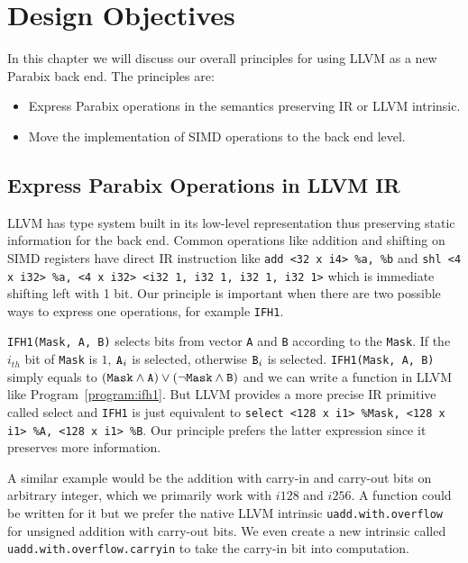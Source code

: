 %
%

\chapter{Design Objectives}
\label{three}

In this chapter we will discuss our overall principles for using LLVM as a new Parabix back end. The principles are:

\begin{itemize}
    \item Express Parabix operations in the semantics preserving IR or LLVM intrinsic.
    \item Move the implementation of SIMD operations to the back end level.
\end{itemize}

\section{Express Parabix Operations in LLVM IR}

LLVM has type system built in its low-level representation thus preserving static information for the back end. Common operations like addition and shifting on SIMD registers have direct IR instruction like \verb|add <32 x i4> %a, %b| and \verb|shl <4 x i32> %a, <4 x i32> <i32 1, i32 1, i32 1, i32 1>| which is immediate shifting left with 1 bit. Our principle is important when there are two possible ways to express one operations, for example {\tt IFH1}.

{\tt IFH1(Mask, A, B)} selects bits from vector {\tt A} and {\tt B} according to the {\tt Mask}. If the $i_{th}$ bit of {\tt Mask} is $1$, $\text{\tt A}_i$ is selected, otherwise $\text{\tt B}_i$ is selected. {\tt IFH1(Mask, A, B)} simply equals to $(\text{\tt Mask} \land \text{\tt A}) \lor (\lnot \text{\tt Mask} \land \text{\tt B})$ and we can write a function in LLVM like Program~\ref{program:ifh1}. But LLVM provides a more precise IR primitive called select and {\tt IFH1} is just equivalent to {\tt select <128 x i1> \%Mask, <128 x i1> \%A, <128 x i1> \%B}. Our principle prefers the latter expression since it preserves more information.

A similar example would be the addition with carry-in and carry-out bits on arbitrary integer, which we primarily work with $i128$ and $i256$. A function could be written for it but we prefer the native LLVM intrinsic {\tt uadd.with.overflow} for unsigned addition with carry-out bits. We even create a new intrinsic called {\tt uadd.with.overflow.carryin} to take the carry-in bit into computation.

